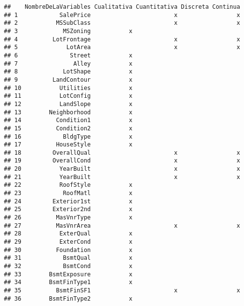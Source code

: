 \documentclass[
]{article}
\begin{document}
\begin{verbatim}
##    NombreDeLaVariables Cualitativa Cuantitativa Discreta Continua
## 1            SalePrice                        x                 x
## 2           MSSubClass                        x                 x
## 3             MSZoning           x                               
## 4          LotFrontage                        x                 x
## 5              LotArea                        x                 x
## 6               Street           x                               
## 7                Alley           x                               
## 8             LotShape           x                               
## 9          LandContour           x                               
## 10           Utilities           x                               
## 11           LotConfig           x                               
## 12           LandSlope           x                               
## 13        Neighborhood           x                               
## 14          Condition1           x                               
## 15          Condition2           x                               
## 16            BldgType           x                               
## 17          HouseStyle           x                               
## 18         OverallQual                        x                 x
## 19         OverallCond                        x                 x
## 20           YearBuilt                        x                 x
## 21           YearBuilt                        x                 x
## 22           RoofStyle           x                               
## 23            RoofMatl           x                               
## 24         Exterior1st           x                               
## 25         Exterior2nd           x                               
## 26          MasVnrType           x                               
## 27          MasVnrArea                        x                 x
## 28           ExterQual           x                               
## 29           ExterCond           x                               
## 30          Foundation           x                               
## 31            BsmtQual           x                               
## 32            BsmtCond           x                               
## 33        BsmtExposure           x                               
## 34        BsmtFinType1           x                               
## 35          BsmtFinSF1                        x                 x
## 36        BsmtFinType2           x                               

\end{verbatim}
\end{document}

